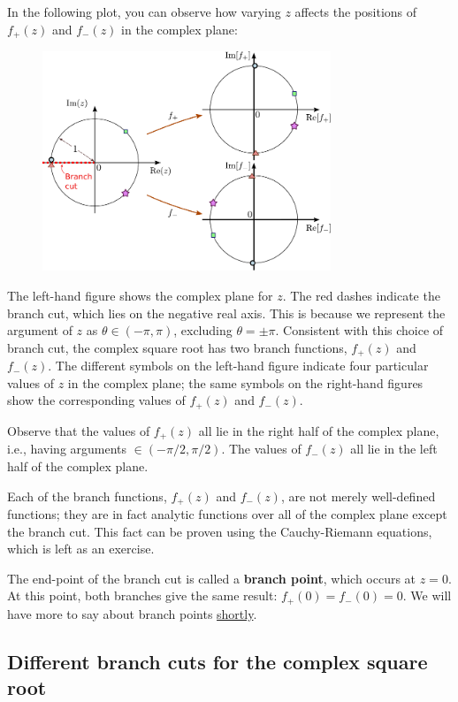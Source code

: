 \documentclass[10pt,a4paper]{article}
\begin{document}
\noindent
In the following plot, you can observe how varying $z$ affects the
positions of $f_+(z)$ and $f_-(z)$ in the complex plane:

\begin{figure}[h]
  \centering\includegraphics[width=0.77\textwidth]{complex_root_1}
\end{figure}

The left-hand figure shows the complex plane for $z$.  The red dashes
indicate the branch cut, which lies on the negative real axis.  This
is because we represent the argument of $z$ as $\theta \in
(-\pi,\pi)$, excluding $\theta = \pm \pi$.  Consistent with this
choice of branch cut, the complex square root has two branch
functions, $f_+(z)$ and $f_-(z)$.  The different symbols on the
left-hand figure indicate four particular values of $z$ in the complex
plane; the same symbols on the right-hand figures show the
corresponding values of $f_+(z)$ and $f_-(z)$.

Observe that the values of $f_+(z)$ all lie in the right half of the
complex plane, i.e., having arguments $\in (-\pi/2, \pi/2)$.  The
values of $f_-(z)$ all lie in the left half of the complex plane.

Each of the branch functions, $f_+(z)$ and $f_-(z)$, are not merely
well-defined functions; they are in fact analytic functions over all
of the complex plane except the branch cut. This fact can be proven
using the Cauchy-Riemann equations, which is left as an exercise.

The end-point of the branch cut is called a \textbf{branch point},
which occurs at $z = 0$.  At this point, both branches give the same
result: $f_+(0) = f_-(0) = 0$. We will have more to say about branch
points \hyperref[branch-points]{shortly}.

\subsection{Different branch cuts for the complex square root}
\end{document}
